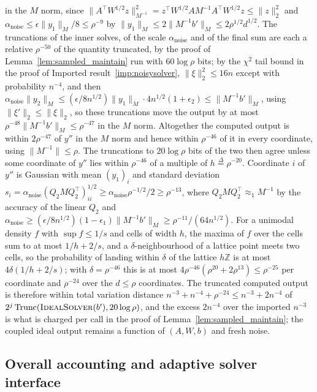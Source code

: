 \documentclass[11pt]{article}
\newcommand{\Trunc}{\operatorname{Trunc}}
\newcommand{\defeq}{\stackrel{\Delta}{=}}
\begin{document}
in the $M$ norm, since
$\|A^\top W^{1/2} z\|_{M^{-1}}^{2} = z^\top W^{1/2} A M^{-1} A^\top W^{1/2} z \le \|z\|_2^{2}$
and $\alpha_{\mathrm{noise}} \le \epsilon \|y_1\|_{M} / 8 \le \rho^{-9}$ by
$\|y_1\|_{M} \le 2 \|M^{-1} b'\|_{M} \le 2 \rho^{1/2} d^{1/2}$.
The truncations of the inner solves, of the scale $\alpha_{\mathrm{noise}}$ and
of the final sum are each a relative $\rho^{-50}$ of the quantity truncated, by
the proof of Lemma~\ref{lem:sampled_maintain} run with $60 \log \rho$ bits; by
the $\chi^{2}$ tail bound in the proof of Imported result~\ref{imp:noisysolver},
$\|\xi\|_2^{2} \le 16 n$ except with probability
$n^{-4}$, and then
$\alpha_{\mathrm{noise}} \|y_2\|_{M} \le (\epsilon / 8 n^{1/2}) \|y_1\|_{M} \cdot 4 n^{1/2} (1 + \epsilon_2) \le \|M^{-1} b'\|_{M}$,
using $\|\xi'\|_2 \le \|\xi\|_2$, so these truncations move the output by at
most $\rho^{-48} \|M^{-1} b'\|_{M} \le \rho^{-47}$ in the
$M$ norm.
Altogether the computed output is within $2 \rho^{-47}$ of
$y''$ in the
$M$ norm and hence within
$\rho^{-46}$ of it in every coordinate, using
$\|M^{-1}\| \le \rho$.
The truncations to $20 \log \rho$ bits of the two then agree unless some
coordinate of $y''$ lies within
$\rho^{-46}$ of a multiple of
$h \defeq \rho^{-20}$.
Coordinate $i$ of
$y''$ is Gaussian with mean
$(y_1)_i$ and standard deviation
$s_i = \alpha_{\mathrm{noise}} (Q_2 M Q_2^\top)_{ii}^{1/2} \ge \alpha_{\mathrm{noise}} \rho^{-1/2} / 2 \ge \rho^{-13}$,
where $Q_2 M Q_2^\top \approx_{1} M^{-1}$ by the accuracy of the linear
$Q_2$ and
$\alpha_{\mathrm{noise}} \ge (\epsilon / 8 n^{1/2}) (1 - \epsilon_1) \|M^{-1} b'\|_{M} \ge \rho^{-11} / (64 n^{1/2})$.
For a unimodal density $f$ with
$\sup f \le 1 / s$ and cells of width
$h$, the maxima of
$f$ over the cells sum to at most
$1 / h + 2 / s$, and a
$\delta$-neighbourhood of a lattice point meets two cells, so the probability of
landing within $\delta$ of the lattice
$h \mathbb{Z}$ is at most
$4 \delta (1 / h + 2 / s)$; with
$\delta = \rho^{-46}$ this is at most
$4 \rho^{-46} (\rho^{20} + 2 \rho^{13}) \le \rho^{-25}$ per coordinate and
$\rho^{-24}$ over the
$d \le \rho$ coordinates.
The truncated computed output is therefore within total variation distance
$n^{-3} + n^{-4} + \rho^{-24} \le n^{-3} + 2 n^{-4}$ of
$2^{j} \Trunc(\textsc{IdealSolver}(b'), 20 \log \rho)$, and the excess
$2 n^{-4}$ over the imported
$n^{-3}$ is what is charged per call in the proof of
Lemma~\ref{lem:sampled_maintain}; the coupled ideal output remains a function of
$(A, W, b)$ and fresh noise.

\subsection{Overall accounting and adaptive solver interface}
\label{subsec:inv_maintain_stable_pf}
\end{document}

